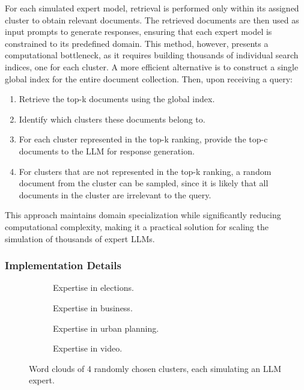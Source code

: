 For each simulated expert model, retrieval is performed only within its assigned cluster to obtain relevant documents. The retrieved documents are then used as input prompts to generate responses, ensuring that each expert model is constrained to its predefined domain. This method, however, presents a computational bottleneck, as it requires building thousands of individual search indices, one for each cluster. A more efficient alternative is to construct a single global index for the entire document collection. Then, upon receiving a query:
\begin{enumerate}
    \item Retrieve the top-k documents using the global index.
    \item Identify which clusters these documents belong to.
    \item For each cluster represented in the top-k ranking, provide the top-c documents to the LLM for response generation.
    \item For clusters that are not represented in the top-k ranking, a random document from the cluster can be sampled, since it is likely that all documents in the cluster are irrelevant to the query.
\end{enumerate}
This approach maintains domain specialization while significantly reducing computational complexity, making it a practical solution for scaling the simulation of thousands of expert LLMs.

\subsubsection{Implementation Details}

\begin{figure}[t!]
\begin{subfigure}{0.49\columnwidth}
  \centering
  \caption{Expertise in elections.}
  \label{fig:cluster_1}
\end{subfigure}
\begin{subfigure}{0.49\columnwidth}
  \centering
  \caption{Expertise in business.}
  \label{fig:cluster_2}
\end{subfigure}
\begin{subfigure}{0.49\columnwidth}
  \centering
  \caption{Expertise in urban planning.}
  \label{fig:cluster_3}
\end{subfigure}
\begin{subfigure}{.49\columnwidth}
  \centering
  \caption{Expertise in video.}
  \label{fig:cluster_4}
\end{subfigure}
\caption{Word clouds of 4 randomly chosen clusters, each simulating an LLM expert.}
\label{fig:word_cloud}
\end{figure}

